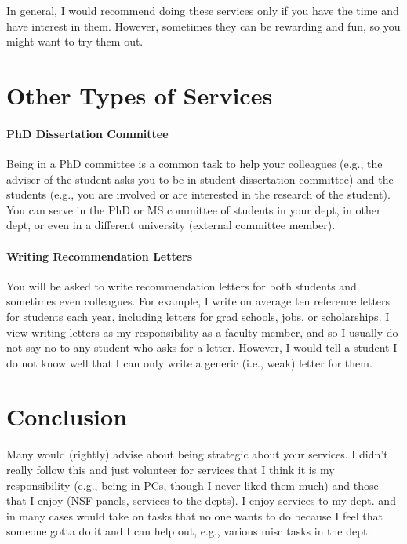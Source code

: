 \documentclass[oneside,11pt,dvipsnames]{book}
\begin{document}
In general, I would recommend doing these services only if you have the time and have interest in them. However, sometimes they can be rewarding and fun, so you might want to try them out.

\section{Other Types of Services}

\paragraph{PhD Dissertation Committee} Being in a PhD committee is a common task to help your colleagues (e.g., the adviser of the student asks you to be in student dissertation committee) and the students (e.g., you are involved or are interested in the research of the student).  You can serve in the PhD or MS committee of students in your dept, in other dept, or even in a different university (external committee member).

\paragraph{Writing Recommendation Letters} You will be asked to write recommendation letters for both students and sometimes even colleagues. For example, I write on average ten reference letters for students each year, including letters for grad schools, jobs, or scholarships. I view writing letters as my responsibility as a faculty member, and so I usually do not say no to any student who asks for a letter. However, I would tell a student I do not know well that I can only write a generic  (i.e., weak) letter for them. 


\section{Conclusion}

Many would (rightly) advise about being strategic about your services. I didn't really follow this and just volunteer for services that I think it is my responsibility (e.g., being in PCs, though I never liked them much) and those that I enjoy (NSF panels, services to the depts). I enjoy services to my dept. and in many cases would take on tasks that no one wants to do because I feel that someone gotta do it and I can help out, e.g., various misc tasks in the dept.
\end{document}
